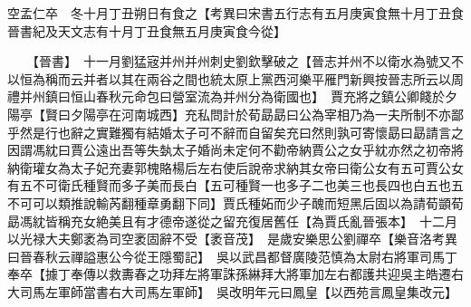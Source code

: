 空孟仁卒　冬十月丁丑朔日有食之【考異曰宋書五行志有五月庚寅食無十月丁丑食晉書紀及天文志有十月丁丑食無五月庚寅食今從】

　　【晉書】　十一月劉猛宼并州并州刺史劉欽擊破之【晉志并州不以衛水為號又不以恒為稱而云并者以其在兩谷之間也統太原上黨西河樂平雁門新興按晉志所云以周禮并州鎮曰恒山春秋元命包曰營室流為并州分為衛國也】　賈充將之鎮公卿餞於夕陽亭【賢曰夕陽亭在河南城西】充私問計於荀勗勗曰公為宰相乃為一夫所制不亦鄙乎然是行也辭之實難獨有結婚太子可不辭而自留矣充曰然則孰可寄懷勗曰勗請言之因謂馮紞曰賈公遠出吾等失埶太子婚尚未定何不勸帝納賈公之女乎紞亦然之初帝將納衛瓘女為太子妃充妻郭槐賂楊后左右使后說帝求納其女帝曰衛公女有五可賈公女有五不可衛氏種賢而多子美而長白【五可種賢一也多子二也美三也長四也白五也五不可可以類推說輸芮翻種章勇翻下同】賈氏種妬而少子醜而短黑后固以為請荀顗荀勗馮紞皆稱充女絶美且有才德帝遂從之留充復居舊任【為賈氏亂晉張本】　十二月以光禄大夫鄭袤為司空袤固辭不受【袤音茂】　是歲安樂思公劉禪卒【樂音洛考異曰晉春秋云禪謚惠公今從王隱蜀記】　吳以武昌都督廣陵范慎為太尉右將軍司馬丁奉卒【據丁奉傳以救夀春之功拜左將軍誅孫綝拜大將軍加左右都護共迎吳主皓遷右大司馬左軍師當書右大司馬左軍師】　吳改明年元曰鳳皇【以西苑言鳳皇集改元】

